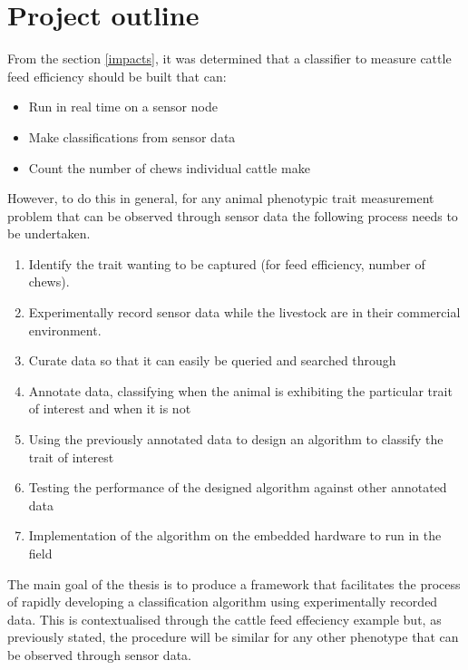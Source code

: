 \chapter{Project outline}

From the section \ref{impacts}, it was determined that a classifier to measure cattle feed efficiency should be built that can:

\begin{itemize}
\item Run in real time on a sensor node
\item Make classifications from sensor data
\item Count the number of chews individual cattle make
\end{itemize}

However, to do this in general, for any animal phenotypic trait measurement problem that can be observed through sensor data the following process needs to be undertaken. 

\begin{enumerate}
\item Identify the trait wanting to be captured (for feed efficiency, number of chews).

\item Experimentally record sensor data while the livestock are in their commercial environment. 

\item Curate data so that it can easily be queried and searched through

\item Annotate data, classifying when the animal is exhibiting the particular trait of interest and when it is not

\item Using the previously annotated data to design an algorithm to classify the trait of interest

\item Testing the performance of the designed algorithm against other annotated data

\item Implementation of the algorithm on the embedded hardware to run in the field
\end{enumerate}

The main goal of the thesis is to produce a framework that facilitates the process of rapidly developing a classification algorithm using experimentally recorded data. This is contextualised through the cattle feed effeciency example but, as previously stated, the procedure will be similar for any other phenotype that can be observed through sensor data.

